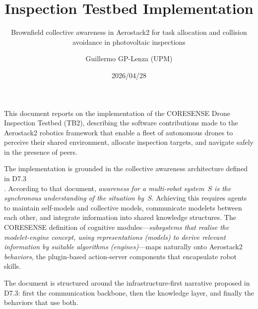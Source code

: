 \documentclass[deliverable]{csreport}
\begin{document}

\title{Inspection Testbed Implementation}
\subtitle{Brownfield collective awareness in Aerostack2 for task allocation and collision avoidance in photovoltaic inspections }
\author{Guillermo GP-Lenza (UPM)}
\date{2026/04/28}

\maketitle

\executivesummary

This document reports on the implementation of the CORESENSE Drone Inspection Testbed (TB2), describing the software contributions made to the Aerostack2 robotics framework that enable a fleet of autonomous drones to perceive their shared environment, allocate inspection targets, and navigate safely in the presence of peers.

The implementation is grounded in the collective awareness architecture defined in D7.3 \\ \cite{CORESENSE-D73}.
According to that document, \emph{awareness for a multi-robot system~$S$ is the synchronous understanding of the situation by~$S$}.
Achieving this requires agents to maintain self-models and collective models, communicate modelets between each other, and integrate information into shared knowledge structures.
The CORESENSE definition of cognitive modules---\emph{subsystems that realise the modelet-engine concept, using representations (models) to derive relevant information by suitable algorithms (engines)}---maps naturally onto Aerostack2 \emph{behaviors}, the plugin-based action-server components that encapsulate robot skills.

The document is structured around the infrastructure-first narrative proposed in D7.3: first the communication backbone, then the knowledge layer, and finally the behaviors that use both.
\end{document}
